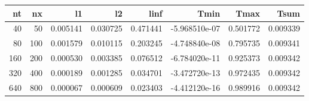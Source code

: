 \begin{tabular}{rrrrrrrr}
\toprule
  nt &   nx &        l1 &        l2 &      linf &          Tmin &      Tmax &      Tsum \\
\midrule
  40 &   50 &  0.005141 &  0.030725 &  0.471441 & -5.968510e-07 &  0.501772 &  0.009339 \\
  80 &  100 &  0.001579 &  0.010115 &  0.203245 & -4.748840e-08 &  0.795735 &  0.009341 \\
 160 &  200 &  0.000530 &  0.003385 &  0.076512 & -6.784020e-11 &  0.925373 &  0.009342 \\
 320 &  400 &  0.000189 &  0.001285 &  0.034701 & -3.472720e-13 &  0.972435 &  0.009342 \\
 640 &  800 &  0.000067 &  0.000609 &  0.023403 & -4.412120e-16 &  0.989916 &  0.009342 \\
\bottomrule
\end{tabular}
